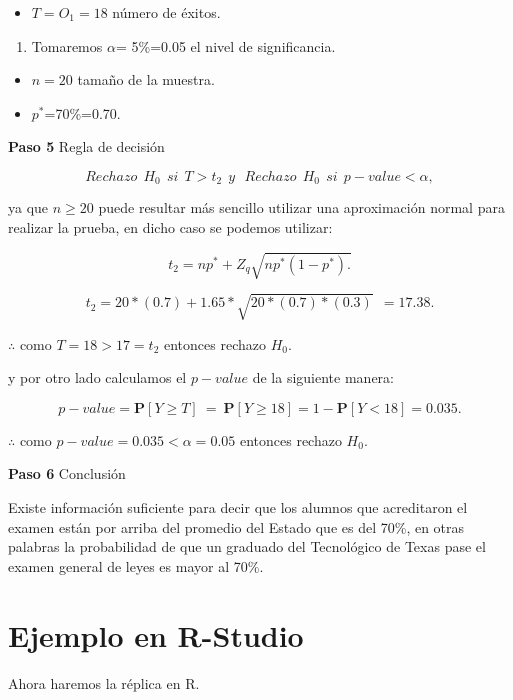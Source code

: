 \documentclass[
  a4paper,
  oneside,
  openany]{book}
\providecommand{\tightlist}{%
  \setlength{\itemsep}{0pt}\setlength{\parskip}{0pt}}
\begin{document}
\begin{itemize}
\tightlist
\item
  \(T=O_{1}=18\) número de éxitos.
\end{itemize}

\begin{enumerate}
\def\labelenumi{\arabic{enumi}.}
\setcounter{enumi}{2}
\tightlist
\item
  Tomaremos \(\alpha\)= 5\%=0.05 el nivel de significancia.
\end{enumerate}

\begin{itemize}
\item
  \(n=20\) tamaño de la muestra.
\item
  \(p^*\)=70\%=0.70.
\end{itemize}

\textbf{Paso 5} Regla de decisión

\[Rechazo \ \  H_0 \ \  si \ \ T>t_{2} \ \  y \ \ \  Rechazo \ \  H_0 \ \ si \ \  p-value<\alpha,\]

ya que \(n \geq 20\) puede resultar más sencillo utilizar una aproximación normal para realizar la prueba, en dicho caso se podemos utilizar:

\[t_{2}=np^*+Z_{q}\sqrt{np^*(1-p^*).}\]

\[t_{2}=20*(0.7)+1.65*\sqrt{20*(0.7)*(0.3)} \ \ = 17.38.\]

\(\therefore\) como \(T=18>17=t_{2}\) entonces rechazo \(H_0\).

y por otro lado calculamos el \(p-value\) de la siguiente manera:

\[p-value= \mathbf{P}[Y \geq T] \  = \ \mathbf{P}[Y \geq 18]=1-\mathbf{P}[Y < 18]= 0.035.\]

\(\therefore\) como \(p-value=0.035<\alpha=0.05\) entonces rechazo \(H_0\).

\textbf{Paso 6} Conclusión

Existe información suficiente para decir que los alumnos que acreditaron el examen están por arriba del promedio del Estado que es del 70\%, en otras palabras la probabilidad de que un graduado del Tecnológico de Texas pase el examen general de leyes es mayor al 70\%.

\hypertarget{ejemplo-en-r-studio}{%
\section{Ejemplo en R-Studio}\label{ejemplo-en-r-studio}}

Ahora haremos la réplica en R.
\end{document}
